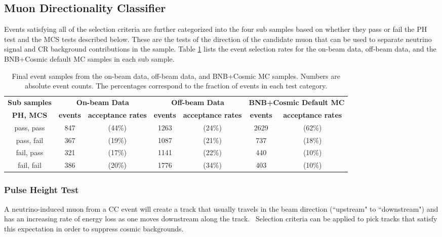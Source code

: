 \documentclass{article}
\begin{document}
\subsection{Muon Directionality Classifier}

Events satisfying all of the selection criteria are further categorized into
the four sub samples based on whether they pass or fail the PH test and the
MCS tests described below. These are the tests of the direction of the candidate
muon that can be used to separate neutrino signal and CR background contributions
in the sample. Table \ref{tab:acceptance_rates} lists the event selection
rates for the on-beam data, off-beam data, and the BNB+Cosmic default MC samples in
each sub sample. 
\begin{table}[tbp]
\caption{Final event samples from the on-beam data, off-beam data, and
BNB+Cosmic MC samples. Numbers are absolute event counts. The percentages
correspond to the fraction of events in each test category.}
\label{tab:acceptance_rates}\centering
\renewcommand{\tabcolsep}{1pt} 
\begin{tabular}{c|c|c|c|c|c|c}
\textbf{Sub samples} & \multicolumn{2}{|c}{\textbf{On-beam Data}} & \multicolumn{2}{|c}{
\textbf{Off-beam Data}} & \multicolumn{2}{|c}{\textbf{BNB+Cosmic Default MC}} \\ 
\textbf{PH, MCS} & \textbf{events} & \textbf{acceptance rates} & \textbf{events} & \textbf{acceptance rates} & \textbf{events} & \textbf{acceptance rates} \\ \hline
pass, pass & 847 & (44\%) & 1263 & (24\%) & 2629 & (62\%) \\ 
pass, fail & 367 & (19\%) & 1087 & (21\%) & 737 & (18\%) \\ 
fail, pass & 321 & (17\%) & 1141 & (22\%) & 440 & (10\%) \\ 
fail, fail & 386 & (20\%) & 1776 & (34\%) & 403 & (10\%) \\ 
\end{tabular}%
\end{table}

\subsubsection{Pulse Height Test}

\label{PH} A neutrino-induced muon from a CC event will create a track that
usually travels in the beam direction (``upstream" to ``downstream") and has an increasing rate of energy loss as one moves downstream along the track. \ Selection criteria can be applied to
pick tracks that satisfy this expectation in order to suppress cosmic
backgrounds.
\end{document}
